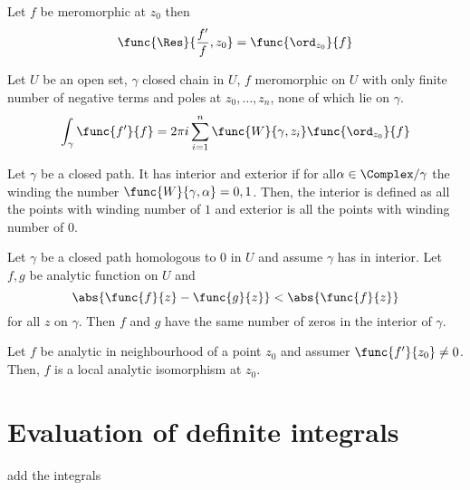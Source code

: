 \begin{lemma}
    Let \(f\) be meromorphic at \(z_0\) then 
    \begin{equation*}
        \func{\Res}{\dfrac{f'}{f}, z_0} = \func{\ord_{z_0}}{f}
    \end{equation*}
\end{lemma}

\begin{theorem}
    Let \(U\) be an open set, \(\gamma\) closed chain in \(U\), \(f\) meromorphic on \(U\) with only finite number of negative terms and poles at \(z_0, \dots , z_n\), none of which lie on \(\gamma\). 
    \begin{equation*}
        \int_{\gamma} \func{f'}{f} = 2\pi i \sum_{i = 1}^n \func{W}{\gamma, z_i} \func{\ord_{z_0}}{f}
    \end{equation*}
\end{theorem}

\begin{definition}
    Let \(\gamma\) be a closed path. It has interior and exterior if for all\( \alpha \in \Complex / \gamma\) the winding the number \(\func{W}{\gamma, \alpha} = 0,1\). Then, the interior is defined as all the points with winding number of \(1\) and exterior is all the points with winding number of \(0\).
\end{definition}

\begin{theorem}[Rouche's]
    Let \(\gamma\) be a closed path homologous to \(0\) in \(U\) and assume \(\gamma\) has in interior. Let \(f,g\) be analytic function on \(U\) and 
    \begin{equation*}
        \abs{\func{f}{z} - \func{g}{z}} < \abs{\func{f}{z}}
    \end{equation*}
    for all \(z\) on \(\gamma\). Then \(f\) and \( g\) have the same number of zeros in the interior of \(\gamma\).
\end{theorem}

\begin{theorem}
    Let \(f\) be analytic in neighbourhood of a point \(z_0\) and assumer \(\func{f'}{z_0} \neq 0\). Then, \(f\) is a local analytic isomorphism at \(z_0\).
\end{theorem}

\section{Evaluation of definite integrals}
add the integrals